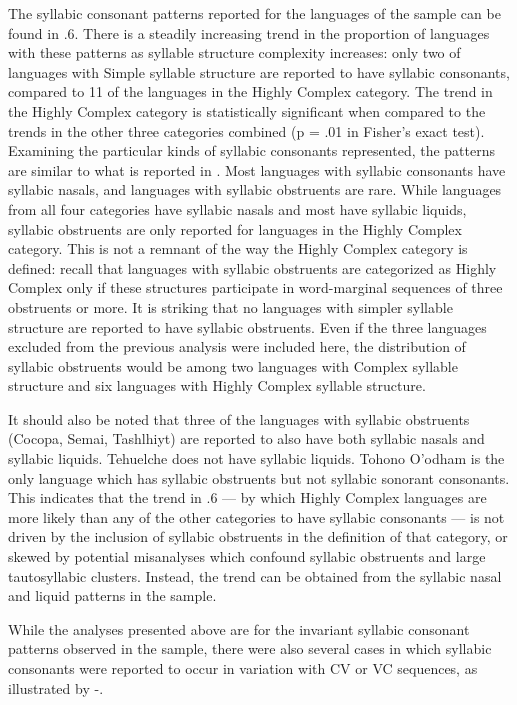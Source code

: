   The syllabic consonant patterns reported for the languages of the sample can be found in .6. There is a steadily increasing trend in the proportion of languages with these patterns as syllable structure complexity increases: only two of languages with Simple syllable structure are reported to have syllabic consonants, compared to 11 of the languages in the Highly Complex category. The trend in the Highly Complex category is statistically significant when compared to the trends in the other three categories combined (p = .01 in Fisher’s exact test). Examining the particular kinds of syllabic consonants represented, the patterns are similar to what is reported in \citet{Bell1978a}. Most languages with syllabic consonants have syllabic nasals, and languages with syllabic obstruents are rare. While languages from all four categories have syllabic nasals and most have syllabic liquids, syllabic obstruents are only reported for languages in the Highly Complex category. This is not a remnant of the way the Highly Complex category is defined: recall that languages with syllabic obstruents are categorized as Highly Complex only if these structures participate in word-marginal sequences of three obstruents or more. It is striking that no languages with simpler syllable structure are reported to have syllabic obstruents. Even if the three languages excluded from the previous analysis were included here, the distribution of syllabic obstruents would be among two languages with Complex syllable structure and six languages with Highly Complex syllable structure. 

  It should also be noted that three of the languages with syllabic obstruents (Cocopa, Semai, Tashlhiyt) are reported to also have both syllabic nasals and syllabic liquids. Tehuelche does not have syllabic liquids. Tohono O’odham is the only language which has syllabic obstruents but not syllabic sonorant consonants. This indicates that the trend in .6 — by which Highly Complex languages are more likely than any of the other categories to have syllabic consonants  — is not driven by the inclusion of syllabic obstruents in the definition of that category, or skewed by potential misanalyses which confound syllabic obstruents and large tautosyllabic clusters. Instead, the trend can be obtained from the syllabic nasal and liquid patterns in the sample.

  While the analyses presented above are for the invariant syllabic consonant patterns observed in the sample, there were also several cases in which syllabic consonants were reported to occur in variation with CV or VC sequences, as illustrated by -.

